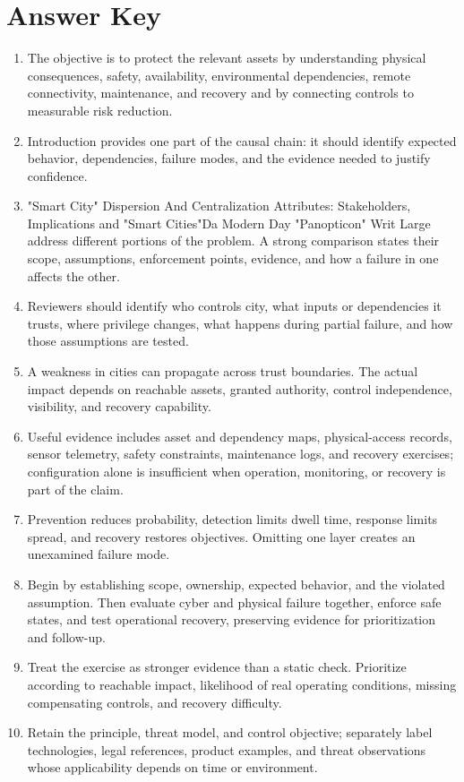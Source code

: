 \documentclass[11pt,letterpaper]{article}
\begin{document}
\section*{Answer Key}
\begin{enumerate}
\item The objective is to protect the relevant assets by understanding physical consequences, safety, availability, environmental dependencies, remote connectivity, maintenance, and recovery and by connecting controls to measurable risk reduction.
\item Introduction provides one part of the causal chain: it should identify expected behavior, dependencies, failure modes, and the evidence needed to justify confidence.
\item "Smart City" Dispersion And Centralization Attributes: Stakeholders, Implications and "Smart Cities"Da Modern Day "Panopticon" Writ Large address different portions of the problem. A strong comparison states their scope, assumptions, enforcement points, evidence, and how a failure in one affects the other.
\item Reviewers should identify who controls city, what inputs or dependencies it trusts, where privilege changes, what happens during partial failure, and how those assumptions are tested.
\item A weakness in cities can propagate across trust boundaries. The actual impact depends on reachable assets, granted authority, control independence, visibility, and recovery capability.
\item Useful evidence includes asset and dependency maps, physical-access records, sensor telemetry, safety constraints, maintenance logs, and recovery exercises; configuration alone is insufficient when operation, monitoring, or recovery is part of the claim.
\item Prevention reduces probability, detection limits dwell time, response limits spread, and recovery restores objectives. Omitting one layer creates an unexamined failure mode.
\item Begin by establishing scope, ownership, expected behavior, and the violated assumption. Then evaluate cyber and physical failure together, enforce safe states, and test operational recovery, preserving evidence for prioritization and follow-up.
\item Treat the exercise as stronger evidence than a static check. Prioritize according to reachable impact, likelihood of real operating conditions, missing compensating controls, and recovery difficulty.
\item Retain the principle, threat model, and control objective; separately label technologies, legal references, product examples, and threat observations whose applicability depends on time or environment.
\end{enumerate}
\end{document}
